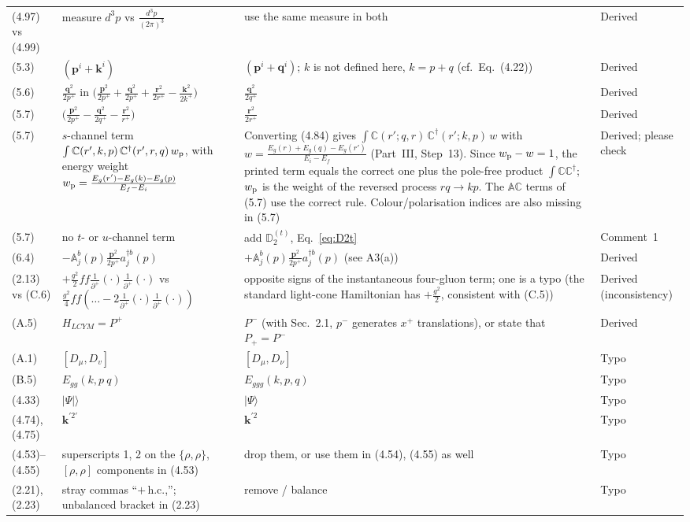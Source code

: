 \documentclass[11pt,a4paper]{article}
\newcommand{\bk}{\mathbf{k}}
\newcommand{\bp}{\mathbf{p}}
\newcommand{\bq}{\mathbf{q}}
\newcommand{\br}{\mathbf{r}}
\newcommand{\eq}[1]{Eq.~(#1)}
\begin{document}
\begin{longtable}{>{\raggedright\arraybackslash}p{1.25cm}>{\raggedright\arraybackslash}p{4.6cm}>{\raggedright\arraybackslash}p{5.6cm}>{\raggedright\arraybackslash}p{2.6cm}}
(4.97) vs (4.99) & measure $d^3p$ vs $\frac{d^3p}{(2\pi)^3}$ & use the same measure in both & Derived\\
(5.3) & $(\bp^i+\mathbf k^i)$ & $(\bp^i+\bq^i)$; $k$ is not defined here, $k=p+q$ (cf.\ \eq{4.22}) & Derived\\
(5.6) & $\frac{\bq^2}{2p^+}$ in $\big(\frac{\bp^2}{2p^+}+\frac{\bq^2}{2p^+}+\frac{\br^2}{2r^+}-\frac{\bk^2}{2k^+}\big)$ & $\frac{\bq^2}{2q^+}$ & Derived\\
(5.7) & $\big(\frac{\bp^2}{2p^+}-\frac{\bq^2}{2q^+}-\frac{\br^2}{r^+}\big)$ & $\frac{\br^2}{2r^+}$ & Derived\\
(5.7) & $s$-channel term $\int\mathbb C(r',k,p)\,\mathbb C^\dagger(r',r,q)\,w_{\rm p}$, with energy weight $w_{\rm p}=\frac{E_g(r')-E_g(k)-E_g(p)}{E_f-E_i}$ & Converting (4.84) gives $\int\mathbb C(r';q,r)\,\mathbb C^\dagger(r';k,p)\,w$ with $w=\frac{E_g(r)+E_g(q)-E_g(r')}{E_i-E_f}$ (Part~III, Step~13). Since $w_{\rm p}-w=1$, the printed term equals the correct one plus the pole-free product $\int\mathbb C\mathbb C^\dagger$; $w_{\rm p}$ is the weight of the reversed process $rq\to kp$. The $\mathbb A\mathbb C$ terms of (5.7) use the correct rule. Colour/polarisation indices are also missing in (5.7) & Derived; please check\\
(5.7) & no $t$- or $u$-channel term & add $\mathbb D_2^{(t)}$, Eq.~\eqref{eq:D2t} & Comment~1\\
(6.4) & $-\mathbb A^b_j(p)\frac{\bp^2}{2p^+}a^{\dagger b}_j(p)$ & $+\mathbb A^b_j(p)\frac{\bp^2}{2p^+}a^{\dagger b}_j(p)$ (see A3(a)) & Derived\\
(2.13) vs (C.6) & $+\frac{g^2}{2}ff\frac1{\partial^+}(\cdot)\frac1{\partial^+}(\cdot)$ vs $\frac{g^2}{4}ff(\dots-2\frac1{\partial^+}(\cdot)\frac1{\partial^+}(\cdot))$ & opposite signs of the instantaneous four-gluon term; one is a typo (the standard light-cone Hamiltonian has $+\frac{g^2}{2}$, consistent with (C.5)) & Derived (inconsistency)\\
(A.5) & $H_{LCYM}=P^+$ & $P^-$ (with Sec.~2.1, $p^-$ generates $x^+$ translations), or state that $P_+=P^-$ & Derived\\
(A.1) & $[D_\mu,D_v]$ & $[D_\mu,D_\nu]$ & Typo\\
(B.5) & $E_{gg}(k,p\ q)$ & $E_{ggg}(k,p,q)$ & Typo\\
(4.33) & $|\Psi|\rangle$ & $|\Psi\rangle$ & Typo\\
(4.74), (4.75) & $\mathbf k^{\prime 2\prime}$ & $\mathbf k^{\prime2}$ & Typo\\
(4.53)--(4.55) & superscripts 1, 2 on the $\{\rho,\rho\}$, $[\rho,\rho]$ components in (4.53) & drop them, or use them in (4.54), (4.55) as well & Typo\\
(2.21), (2.23) & stray commas ``$+\,$h.c.,''; unbalanced bracket in (2.23) & remove / balance & Typo\\
\bottomrule
\end{longtable}
\normalsize
\end{document}
